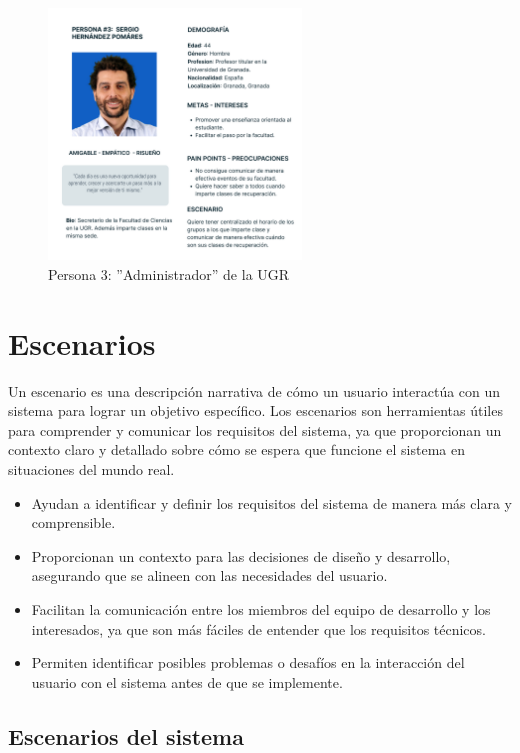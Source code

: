 \begin{figure}[H]
    \centering
    \includegraphics[width=0.6\textwidth]{figures/04_persona_3.png}
    \caption{Persona 3: ''Administrador'' de la UGR}
    \label{fig:persona_3}
\end{figure}

\section{Escenarios}

Un escenario es una descripción narrativa de cómo un usuario interactúa con un sistema para lograr un objetivo específico. Los escenarios son herramientas útiles para comprender y comunicar los requisitos del sistema, ya que proporcionan un contexto claro y detallado sobre cómo se espera que funcione el sistema en situaciones del mundo real.
\newline
{}
\begin{itemize}
    \item Ayudan a identificar y definir los requisitos del sistema de manera más clara y comprensible.
    \item Proporcionan un contexto para las decisiones de diseño y desarrollo, asegurando que se alineen con las necesidades del usuario.
    \item Facilitan la comunicación entre los miembros del equipo de desarrollo y los interesados, ya que son más fáciles de entender que los requisitos técnicos.
    \item Permiten identificar posibles problemas o desafíos en la interacción del usuario con el sistema antes de que se implemente.
\end{itemize}

\subsection{Escenarios del sistema}

